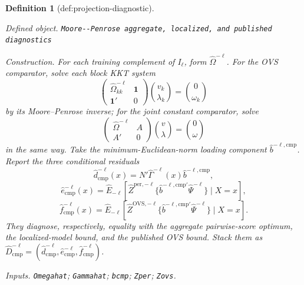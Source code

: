 \documentclass{article}
\newtheorem{definition}{Definition}
\begin{document}
\begin{definition}[def:projection-diagnostic]\label{def:projection-diagnostic}
\par\smallskip\noindent\emph{Defined object.} \texttt{Moore-\allowbreak{}-\allowbreak{}Penrose aggregate,\allowbreak{} localized,\allowbreak{} and published diagnostics}
\par\smallskip\noindent\emph{Construction.} For each training complement of \(I_\ell\), form \(\widehat\Omega^{-\ell}\).  For the OVS comparator, solve each block KKT system
\[
\begin{pmatrix}\widehat\Omega^{-\ell}_{kk}&\mathbf 1\\ \mathbf 1'&0\end{pmatrix}
\binom{v_k}{\lambda_k}=\binom{0}{\omega_k}
\]
by its Moore--Penrose inverse; for the joint constant comparator, solve
\[
\begin{pmatrix}\widehat\Omega^{-\ell}&A\\ A'&0\end{pmatrix}
\binom{v}{\lambda}=\binom{0}{\omega}
\]
in the same way.  Take the minimum-Euclidean-norm loading component \(\widehat b^{-\ell,\mathrm{cmp}}\).  Report the three conditional residuals
\[
\widehat d^{-\ell}_{\mathrm{cmp}}(x)
=N'\widehat\Gamma^{-\ell}(x)\widehat b^{-\ell,\mathrm{cmp}},
\]
\[
\widehat e^{-\ell}_{\mathrm{cmp}}(x)
=\widehat E_{-\ell}\!\left[
\widehat Z^{\mathrm{per},-\ell}
\{\widehat b^{-\ell,\mathrm{cmp}\prime}\widehat\Psi^{-\ell}\}
\mid X=x\right],
\]
\[
\widehat f^{-\ell}_{\mathrm{cmp}}(x)
=\widehat E_{-\ell}\!\left[
\widehat Z^{\mathrm{OVS},-\ell}
\{\widehat b^{-\ell,\mathrm{cmp}\prime}\widehat\Psi^{-\ell}\}
\mid X=x\right].
\]
They diagnose, respectively, equality with the aggregate pairwise-score optimum, the localized-model bound, and the published OVS bound.  Stack them as
\(\widehat D^{-\ell}_{\mathrm{cmp}}=(\widehat d^{-\ell}_{\mathrm{cmp}},\widehat e^{-\ell}_{\mathrm{cmp}},\widehat f^{-\ell}_{\mathrm{cmp}})\).
\par\smallskip\noindent\emph{Inputs.} \texttt{Omegahat}; \texttt{Gammahat}; \texttt{bcmp}; \texttt{Zper}; \texttt{Zovs}.
\end{definition}
\end{document}

